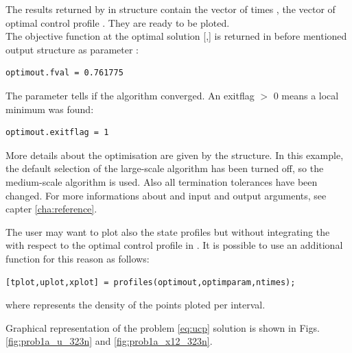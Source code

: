The results returned by  in  structure
contain the vector of times , the vector of optimal control
profile . They are ready to be ploted.\\  
The objective function at the optimal solution [,]
is returned in before mentioned output structure  as
parameter :
\begin{verbatim}
optimout.fval = 0.761775
\end{verbatim}
The parameter  tells if the algorithm converged. An
exitflag $>$ 0 means a local minimum was found: 
\begin{verbatim}
optimout.exitflag = 1
\end{verbatim}
More details about the optimisation are given by the
 structure. In this example, the default
selection of the large-scale algorithm has been turned off, so the
medium-scale algorithm is used. Also all termination tolerances have
been changed. For more informations about  and
 input and output arguments, see capter
\ref{cha:reference}. 

The user may want to plot also the state profiles but without
integrating the  with respect to the optimal control
profile in . It is possible to use an additional
function  for this reason as follows:
\begin{verbatim}
[tplot,uplot,xplot] = profiles(optimout,optimparam,ntimes);
\end{verbatim}
where  represents the density of the points ploted per
interval.

Graphical representation of the problem \eqref{eq:ucp} solution is
shown in Figs. \ref{fig:prob1a_u_323n} and \ref{fig:prob1a_x12_323n}. 


